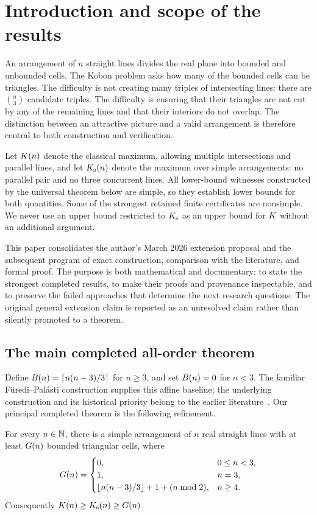 \section{Introduction and scope of the results}\label{sec:introduction}

An arrangement of $n$ straight lines divides the real plane into bounded and unbounded cells. The Kobon problem asks how many of the bounded cells can be triangles. The difficulty is not creating many triples of intersecting lines: there are $\binom n3$ candidate triples. The difficulty is ensuring that their triangles are not cut by any of the remaining lines and that their interiors do not overlap. The distinction between an attractive picture and a valid arrangement is therefore central to both construction and verification.

Let $K(n)$ denote the classical maximum, allowing multiple intersections and parallel lines, and let $K_{\mathrm{s}}(n)$ denote the maximum over simple arrangements: no parallel pair and no three concurrent lines. All lower-bound witnesses constructed by the universal theorem below are simple, so they establish lower bounds for both quantities. Some of the strongest retained finite certificates are nonsimple. We never use an upper bound restricted to $K_{\mathrm{s}}$ as an upper bound for $K$ without an additional argument.

This paper consolidates the author's March 2026 extension proposal and the subsequent program of exact construction, comparison with the literature, and formal proof. The purpose is both mathematical and documentary: to state the strongest completed results, to make their proofs and provenance inspectable, and to preserve the failed approaches that determine the next research questions. The original general extension claim is reported as an unresolved claim rather than silently promoted to a theorem.

\subsection{The main completed all-order theorem}

Define $B(n)=\left\lceil n(n-3)/3\right\rceil$ for $n\ge3$, and set $B(n)=0$ for $n<3$. The familiar F\"uredi--Pal\'asti construction supplies this affine baseline; the underlying construction and its historical priority belong to the earlier literature~\cite{furedipalasti1984,erickson1999}. Our principal completed theorem is the following refinement.

\begin{theorem}\label{thm:main}
For every $n\in\mathbb{N}$, there is a simple arrangement of $n$ real straight lines with at least $G(n)$ bounded triangular cells, where
\begin{equation}\label{eq:G}
G(n)=\begin{cases}
0,&0\le n<3,\\
1,&n=3,\\
\left\lfloor n(n-3)/3\right\rfloor+1+(n\bmod2),&n\ge4.
\end{cases}
\end{equation}
Consequently $K(n)\ge K_{\mathrm{s}}(n)\ge G(n)$.
\end{theorem}

